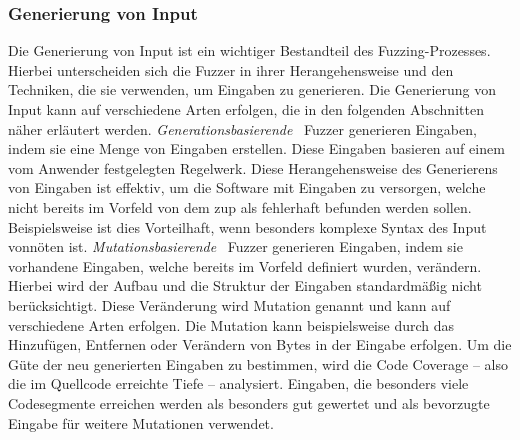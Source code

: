 \subsubsection{Generierung von Input}\label{subsubsec:generierung-von-input}
Die Generierung von Input ist ein wichtiger Bestandteil des Fuzzing-Prozesses.
Hierbei unterscheiden sich die Fuzzer in ihrer Herangehensweise und den Techniken, die sie verwenden, um Eingaben zu generieren.
Die Generierung von Input kann auf verschiedene Arten erfolgen, die in den folgenden Abschnitten näher erläutert werden.\newline\newline
\textit{Generationsbasierende}~\cite{iot-fuzzing} Fuzzer generieren Eingaben, indem sie eine Menge von Eingaben erstellen.
Diese Eingaben basieren auf einem vom Anwender festgelegten Regelwerk.
Diese Herangehensweise des Generierens von Eingaben ist effektiv, um die Software mit Eingaben zu versorgen, welche nicht
bereits im Vorfeld von dem \gls{zup} als fehlerhaft befunden werden sollen.
Beispielsweise ist dies Vorteilhaft, wenn besonders komplexe Syntax des Input vonnöten ist.\newline\newline
\textit{Mutationsbasierende}~\cite{iot-fuzzing} Fuzzer generieren Eingaben, indem sie vorhandene Eingaben, welche bereits im Vorfeld definiert wurden, verändern.
Hierbei wird der Aufbau und die Struktur der Eingaben standardmäßig nicht berücksichtigt.
Diese Veränderung wird Mutation genannt und kann auf verschiedene Arten erfolgen.
Die Mutation kann beispielsweise durch das Hinzufügen, Entfernen oder Verändern von Bytes in der Eingabe erfolgen.
Um die Güte der neu generierten Eingaben zu bestimmen, wird die Code Coverage -- also die im Quellcode erreichte Tiefe --
analysiert.
Eingaben, die besonders viele Codesegmente erreichen werden als besonders gut gewertet und als bevorzugte Eingabe für
weitere Mutationen verwendet.
